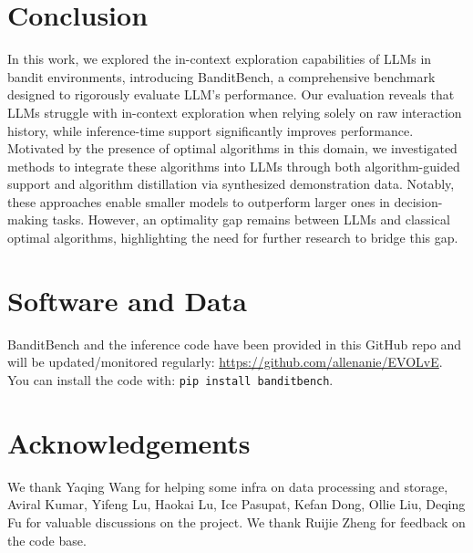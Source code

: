 \documentclass[11pt, logo]{googledeepmind}
\theoremstyle{plain}
\theoremstyle{definition}
\begin{document}
\section{Conclusion}
In this work, we explored the in-context exploration capabilities of LLMs in bandit environments, introducing BanditBench, a comprehensive benchmark designed to rigorously evaluate LLM's performance. Our evaluation reveals that LLMs struggle with in-context exploration when relying solely on raw interaction history, while inference-time support significantly improves performance. Motivated by the presence of optimal algorithms in this domain, we investigated methods to integrate these algorithms into LLMs through both algorithm-guided support and algorithm distillation via synthesized demonstration data. Notably, these approaches enable smaller models to outperform larger ones in decision-making tasks. However, an optimality gap remains between LLMs and classical optimal algorithms, highlighting the need for further research to bridge this gap.
\section*{Software and Data}
BanditBench and the inference code have been provided in this GitHub repo and will be updated/monitored regularly: \url{https://github.com/allenanie/EVOLvE}. You can install the code with: \texttt{pip install banditbench}.
\section*{Acknowledgements}
We thank Yaqing Wang for helping some infra on data processing and storage, Aviral Kumar, Yifeng Lu, Haokai Lu, Ice Pasupat, Kefan Dong, Ollie Liu, Deqing Fu for valuable discussions on the project. We thank Ruijie Zheng for feedback on the code base.

\setcounter{figure}{0}
\renewcommand{\thefigure}{A\arabic{figure}}
\setcounter{table}{0}
\renewcommand{\thetable}{A\arabic{table}}
\appendix
\newpage
\end{document}
